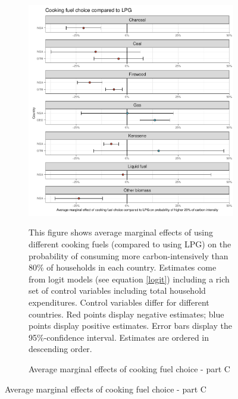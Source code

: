  \begin{figure}[ht!]\ContinuedFloat
   \centering
   \begin{subfigure}[b]{\textwidth}
   \centering
   \includegraphics{1_Figures/Analysis_Logit_Models_Marginal_Effects/Average_Marginal_Effects_affected_upper_80_CF_LPG_2017B.pdf}
   \caption{Average marginal effects of cooking fuel choice - part C} \label{fig:Logit_ME_CF_3}
   \begin{subcaption2}
     This figure shows average marginal effects of using different cooking fuels (compared to using LPG) on the probability of consuming more carbon-intensively than 80\% of households in each country. Estimates come from logit models (see equation \ref{logit}) including a rich set of control variables including total household expenditures. Control variables differ for different countries. Red points display negative estimates; blue points display positive estimates. Error bars display the 95\%-confidence interval. Estimates are ordered in descending order.
   \end{subcaption2}
   \end{subfigure}
 \end{figure}
 \clearpage

